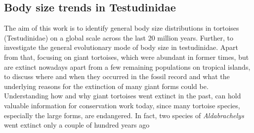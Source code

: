 
 

\subsection{Body size trends in Testudinidae}

The aim of this work is to identify general body size distributions in tortoises (Testudinidae) on a global scale across the last 20 million years. Further, to investigate the general evolutionary mode of body size in testudinidae. 
Apart from that, focusing on giant tortoises, which were abundant in former times, but are extinct nowadays apart from a few remaining populations on tropical islands, to discuss where and when they occurred in the fossil record and what the underlying reasons for the extinction of many giant forms could be.
Understanding how and why giant tortoises went extinct in the past, can hold valuable information for conservation work today, since many tortoise species, especially the large forms, are endangered. In fact, two species of \textit{Aldabrachelys} went extinct only a couple of hundred years ago \citep{.}



